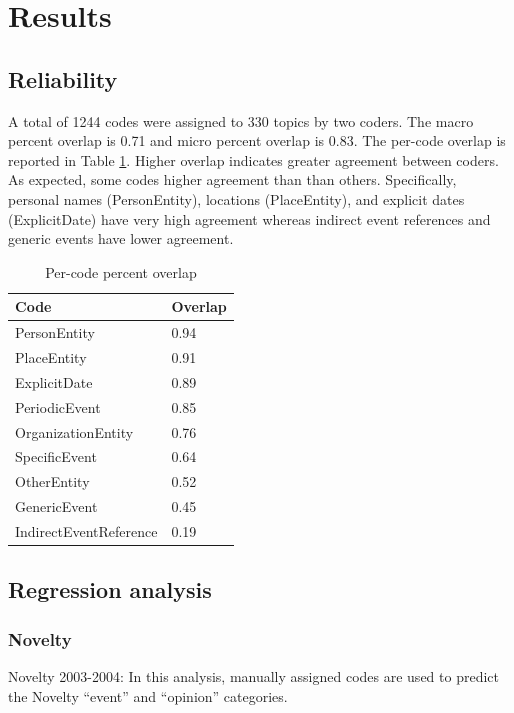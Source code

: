 \documentclass{sig-alternate}
\begin{document}
\section{Results}

\subsection{Reliability}

A total of 1244 codes were assigned to 330 topics by two coders.  The macro percent overlap is 0.71 and  micro percent overlap is 0.83.  The per-code overlap is reported in Table \ref{table.overlap}.  Higher overlap indicates greater agreement between coders. As expected, some codes higher agreement than than others. Specifically, personal names (PersonEntity), locations (PlaceEntity), and explicit dates (ExplicitDate) have very high agreement whereas indirect event references and generic events have lower agreement.

\begin{table}
\small
\begin{tabular}{| l | l |} \hline
\bf{Code} & \bf{Overlap}  \\ \hline
PersonEntity & 0.94  \\ \hline
PlaceEntity  & 0.91  \\ \hline
ExplicitDate & 0.89   \\ \hline
PeriodicEvent & 0.85   \\ \hline
OrganizationEntity & 0.76  \\ \hline
SpecificEvent & 0.64  \\ \hline
OtherEntity & 0.52  \\ \hline
GenericEvent & 0.45  \\ \hline
IndirectEventReference & 0.19  \\ \hline
\end{tabular}
\caption{Per-code percent overlap }
\label{table.overlap}
\end{table}

\subsection{Regression analysis}

\subsubsection{Novelty}
Novelty 2003-2004: In this analysis, manually assigned codes are used to predict the Novelty ``event'' and ``opinion'' categories. 
\end{document}
